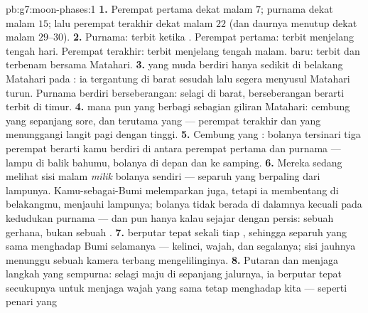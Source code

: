 \begin{solution}{pb:g7:moon-phases:1}
\textbf{1.} Perempat pertama dekat malam $7$; purnama dekat malam
$15$; lalu perempat terakhir dekat malam $22$ (dan daurnya menutup
dekat malam $29$--$30$).
\textbf{2.} Purnama: terbit ketika . Perempat
pertama: terbit menjelang tengah hari. Perempat terakhir: terbit
menjelang tengah malam.  baru: terbit dan terbenam bersama
Matahari.
\textbf{3.}  yang muda berdiri hanya sedikit di belakang Matahari
pada : ia tergantung di barat sesudah  lalu
segera menyusul Matahari turun. Purnama berdiri berseberangan: selagi
 di barat, berseberangan berarti terbit di timur.
\textbf{4.}  mana pun yang berbagi sebagian giliran Matahari:
cembung yang  sepanjang sore, dan terutama  yang 
--- perempat terakhir dan  yang  menunggangi langit pagi
dengan tinggi.
\textbf{5.} Cembung yang : bolanya tersinari tiga perempat
berarti kamu berdiri di antara perempat pertama dan purnama --- lampu
di balik bahumu, bolanya di depan dan ke samping.
\textbf{6.} Mereka sedang melihat sisi malam \emph{milik} bolanya
sendiri --- separuh yang berpaling dari lampunya. Kamu-sebagai-Bumi
melemparkan  juga, tetapi ia membentang di belakangmu,
menjauhi lampunya; bolanya tidak berada di dalamnya kecuali pada
kedudukan purnama --- dan pun hanya kalau sejajar dengan persis:
sebuah gerhana, bukan sebuah .
\textbf{7.}  berputar tepat sekali tiap , sehingga separuh
yang sama menghadap Bumi selamanya --- kelinci, wajah, dan segalanya;
sisi jauhnya menunggu sebuah kamera terbang mengelilinginya.
\textbf{8.} Putaran dan  menjaga langkah yang sempurna: selagi
 maju di sepanjang jalurnya, ia berputar tepat secukupnya untuk
menjaga wajah yang sama tetap menghadap kita --- seperti penari yang

\end{solution}

